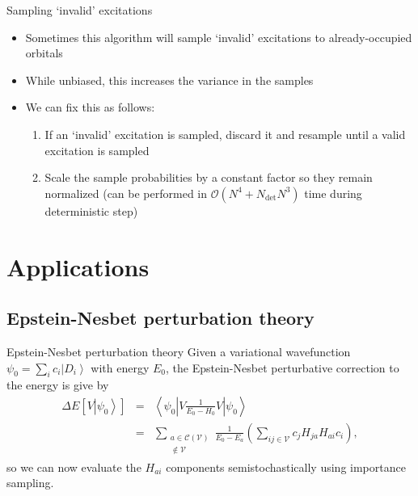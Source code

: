 \documentclass[amsmath]{beamer}
\begin{document}
\begin{frame}{Sampling `invalid' excitations}
\begin{itemize}
	\item Sometimes this algorithm will sample `invalid' excitations to already-occupied orbitals
	\item While unbiased, this increases the variance in the samples
	\item We can fix this as follows:
	\begin{enumerate}
		\item If an `invalid' excitation is sampled, discard it and resample until a valid excitation is sampled
		\item Scale the sample probabilities by a constant factor so they remain normalized (can be performed in $\mathcal{O}(N^4 + N_{\textrm{det}} N^3)$ time during deterministic step)
	\end{enumerate}
\end{itemize}	
\end{frame}

\section{Applications}
\subsection{Epstein-Nesbet perturbation theory}
\begin{frame}{Epstein-Nesbet perturbation theory}
Given a variational wavefunction $\psi_0=\sum_i c_i \left|D_i\right\rangle$ with energy $E_0$, the Epstein-Nesbet perturbative correction to the energy is give by
\begin{eqnarray}
	\Delta E\left[V\left|\psi_0\right\rangle\right] &=& \left\langle \psi_0 \left| V \frac{1}{E_0 - H_0} V \right|\psi_0\right\rangle\\
	&=& \sum_{\substack{a\in \mathcal{C}(\mathcal{V})\\\notin \mathcal{V}}} \frac{1}{E_0 - E_a} \left(\sum_{ij\in\mathcal{V}} c_j H_{ja} H_{ai} c_i\right),
\end{eqnarray}
so we can now evaluate the $H_{ai}$ components semistochastically using importance sampling.
\end{frame}
\end{document}

